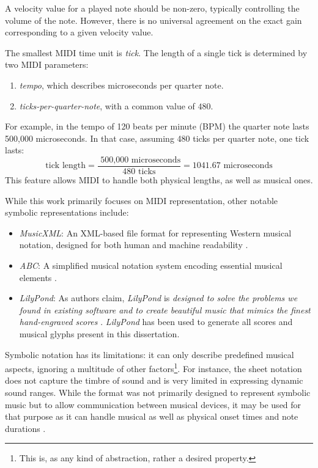 A velocity value for a played note should be non-zero, typically controlling the volume of the note. However, there is no universal agreement on the exact gain corresponding to a given velocity value.

The smallest MIDI time unit is \emph{tick}. The length of a single tick is determined by two MIDI parameters:
\begin{enumerate}
	\item \emph{tempo}, which describes microseconds per quarter note.
	\item \emph{ticks-per-quarter-note}, with a common value of $480$.
\end{enumerate}

For example, in the tempo of 120 beats per minute (BPM) the quarter note lasts 500,000 microseconds. In that case, assuming 480 ticks per quarter note, one tick lasts: \[\textrm{tick length} = \frac{\text{ 500,000 microseconds}}{\text{480 ticks}} = 1041.67 \text{ microseconds}\] This feature allows MIDI to handle both physical lengths, as well as musical ones.

While this work primarily focuses on MIDI representation, other notable symbolic representations include:
\begin{itemize}
   \item \emph{MusicXML}: An XML-based file format for representing Western musical notation, designed for both human and machine readability \cite{Good2001}.
   \item \emph{ABC}: A simplified musical notation system encoding essential musical elements \cite{ABC2013}.
   \item \emph{LilyPond}: As authors claim, \emph{LilyPond} is \emph{designed to solve the problems we found in existing software and to create beautiful music that mimics the finest hand-engraved scores} \cite{LilyPond2002}. \emph{LilyPond} has been used to generate all scores and musical glyphs present in this dissertation.
\end{itemize}

Symbolic notation has its limitations: it can only describe predefined musical aspects, ignoring a multitude of other factors\footnote{This is, as any kind of abstraction, rather a desired property.}. For instance, the sheet notation does not capture the timbre of sound and is very limited in expressing dynamic sound ranges. While the format was not primarily designed to represent symbolic music but to allow communication between musical devices, it may be used for that purpose as it can handle musical as well as physical onset times and note durations \cite{Grohganz2014}.

